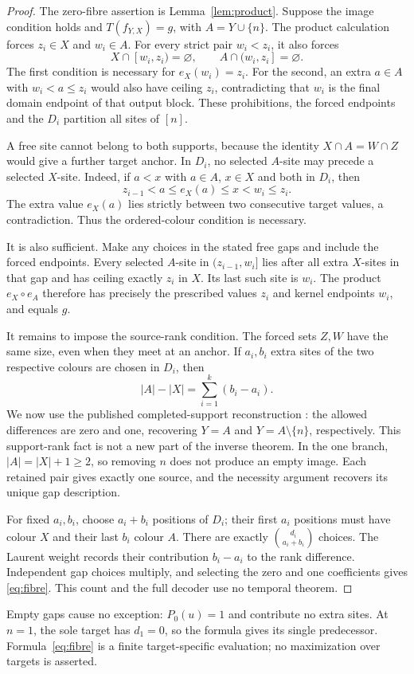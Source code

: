 \begin{proof}
The zero-fibre assertion is Lemma~\ref{lem:product}. Suppose the image
condition holds and $T(f_{Y,X})=g$, with $A=Y\cup\{n\}$.
The product calculation forces $z_i\in X$ and $w_i\in A$.
For every strict pair $w_i<z_i$, it also forces
\begin{equation}\label{eq:forbidden}
 X\cap[w_i,z_i)=\varnothing,\qquad
 A\cap(w_i,z_i]=\varnothing.
\end{equation}
The first condition is necessary for $e_X(w_i)=z_i$. For the second,
an extra $a\in A$ with $w_i<a\le z_i$ would also have ceiling
$z_i$, contradicting that $w_i$ is the final domain endpoint of that
output block. These prohibitions, the forced endpoints and the $D_i$
partition all sites of $[n]$.

A free site cannot belong to both supports, because the identity
$X\cap A=W\cap Z$ would give a further target anchor. In $D_i$,
no selected $A$-site may precede a selected $X$-site. Indeed, if
$a<x$ with $a\in A$, $x\in X$ and both in $D_i$, then
\[
 z_{i-1}<a\le e_X(a)\le x<w_i\le z_i.
\]
The extra value $e_X(a)$ lies strictly between two consecutive target
values, a contradiction. Thus the ordered-colour condition is necessary.

It is also sufficient. Make any choices in the stated free gaps and
include the forced endpoints. Every selected $A$-site in
$(z_{i-1},w_i]$ lies after all extra $X$-sites in that gap and has
ceiling exactly $z_i$ in $X$. Its last such site is $w_i$.
The product $e_X\circ e_A$ therefore has precisely the prescribed
values $z_i$ and kernel endpoints $w_i$, and equals $g$.

It remains to impose the source-rank condition. The forced sets $Z,W$
have the same size, even when they meet at an anchor. If $a_i,b_i$
extra sites of the two respective colours are chosen in $D_i$, then
\[
 |A|-|X|=\sum_{i=1}^{k}(b_i-a_i).
\]
We now use the published completed-support reconstruction
\cite[Section 5.1, after Lemma 5.12]{stein2025order}: the allowed
differences are zero and one, recovering $Y=A$ and
$Y=A\setminus\{n\}$, respectively. This support-rank fact is not a
new part of the inverse theorem. In the one branch, $|A|=|X|+1\ge2$,
so removing $n$ does not produce an empty image. Each retained pair
gives exactly one source, and the necessity argument recovers its unique
gap description.

For fixed $a_i,b_i$, choose $a_i+b_i$ positions of $D_i$; their first
$a_i$ positions must have colour $X$ and their last $b_i$ colour $A$.
There are exactly $\binom{d_i}{a_i+b_i}$ choices. The Laurent weight
records their contribution $b_i-a_i$ to the rank difference. Independent
gap choices multiply, and selecting the zero and one coefficients gives
\eqref{eq:fibre}. This count and the full decoder use no temporal theorem.
\end{proof}

Empty gaps cause no exception: $P_0(u)=1$ and contribute no extra
sites. At $n=1$, the sole target has $d_1=0$, so the formula gives its
single predecessor. Formula~\eqref{eq:fibre} is a finite target-specific
evaluation; no maximization over targets is asserted.
